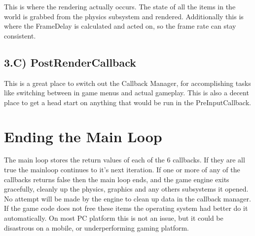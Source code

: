 This is where the rendering actually occurs. The state of all the items in the world is grabbed from the physics subsystem and rendered. Additionally this is where the FrameDelay is calculated and acted on, so the frame rate can stay consistent. \hypertarget{mainloop1_rendering3}{}\subsection{3.C) PostRenderCallback}\label{mainloop1_rendering3}
This is a great place to switch out the Callback Manager, for accomplishing tasks like switching between in game menus and actual gameplay. This is also a decent place to get a head start on anything that would be run in the PreInputCallback. \par
 \hypertarget{mainloop1_endingmainloop1}{}\section{Ending the Main Loop}\label{mainloop1_endingmainloop1}
The main loop stores the return values of each of the 6 callbacks. If they are all true the mainloop continues to it's next iteration. If one or more of any of the callbacks returns false then the main loop ends, and the game engine exits gracefully, cleanly up the physics, graphics and any others subsystems it opened. No attempt will be made by the engine to clean up data in the callback manager. If the game code does not free these items the operating system had better do it automatically. On most PC platform this is not an issue, but it could be disastrous on a mobile, or underperforming gaming platform. 